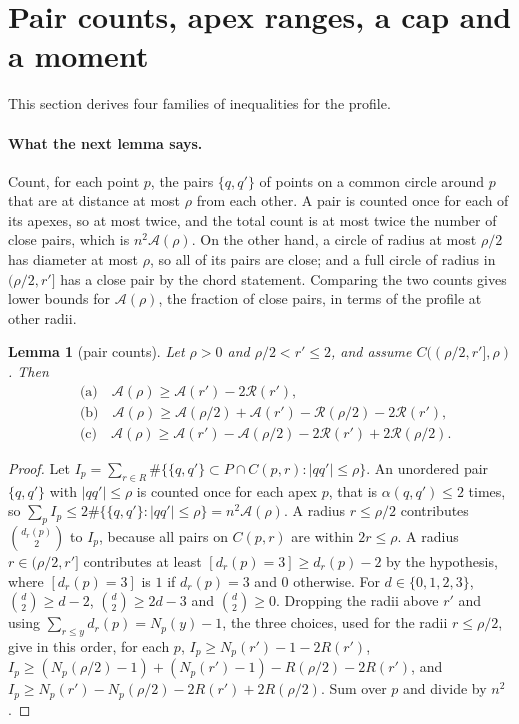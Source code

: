 \documentclass[11pt]{article}
\newcommand{\cA}{\mathcal{A}}
\newcommand{\cR}{\mathcal{R}}
\newtheorem{lemma}[theorem]{Lemma}
\theoremstyle{remark}
\begin{document}
\section{Pair counts, apex ranges, a cap and a moment}\label{sec:rows}

This section derives four families of inequalities for the profile.

\paragraph{What the next lemma says.} Count, for each point $p$, the pairs
$\{q, q'\}$ of points on a common circle around $p$ that are at distance
at most $\rho$ from each other. A pair is counted once for each of its
apexes, so at most twice, and the total count is at most twice the number
of close pairs, which is $n^2\cA(\rho)$. On the other hand, a circle of radius at most $\rho/2$ has
diameter at most $\rho$, so all of its pairs are close; and a full circle
of radius in $(\rho/2, r']$ has a close pair by the chord statement.
Comparing the two counts gives lower bounds for $\cA(\rho)$, the fraction
of close pairs, in terms of the profile at other radii.

\begin{lemma}[pair counts]\label{lem:P}
Let $\rho > 0$ and $\rho/2 < r' \le 2$, and assume $C((\rho/2, r'], \rho)$.
Then
\begin{align*}
  &\text{(a)}\quad \cA(\rho) \ge \cA(r') - 2\cR(r'),\\
  &\text{(b)}\quad \cA(\rho) \ge \cA(\rho/2) + \cA(r') - \cR(\rho/2) - 2\cR(r'),\\
  &\text{(c)}\quad \cA(\rho) \ge \cA(r') - \cA(\rho/2) - 2\cR(r') + 2\cR(\rho/2).
\end{align*}
\end{lemma}

\begin{proof}
Let $I_p = \sum_{r \in R}\#\{\{q,q'\} \subset P\cap C(p,r) : |qq'| \le \rho\}$.
An unordered pair $\{q,q'\}$ with $|qq'| \le \rho$ is counted once for each
apex $p$, that is $\alpha(q,q') \le 2$ times, so
$\sum_p I_p \le 2\#\{\{q,q'\}: |qq'| \le \rho\} = n^2\cA(\rho)$. A radius
$r \le \rho/2$ contributes $\binom{d_r(p)}2$ to $I_p$, because all pairs on
$C(p,r)$ are within $2r \le \rho$. A radius $r \in (\rho/2, r']$ contributes
at least $[d_r(p) = 3] \ge d_r(p) - 2$ by the hypothesis, where $[d_r(p) = 3]$ is $1$ if $d_r(p) = 3$ and $0$ otherwise. For
$d \in \{0,1,2,3\}$, $\binom d2 \ge d - 2$, $\binom d2 \ge 2d-3$ and
$\binom d2 \ge 0$. Dropping the radii above $r'$ and using
$\sum_{r \le y} d_r(p) = N_p(y) - 1$, the three choices, used for the radii $r \le \rho/2$, give in this order, for each $p$,
$I_p \ge N_p(r') - 1 - 2R(r')$, $I_p \ge (N_p(\rho/2) - 1) + (N_p(r') - 1) -
R(\rho/2) - 2R(r')$, and $I_p \ge N_p(r') - N_p(\rho/2) - 2R(r') +
2R(\rho/2)$. Sum over $p$ and divide by $n^2$.
\end{proof}
\end{document}
